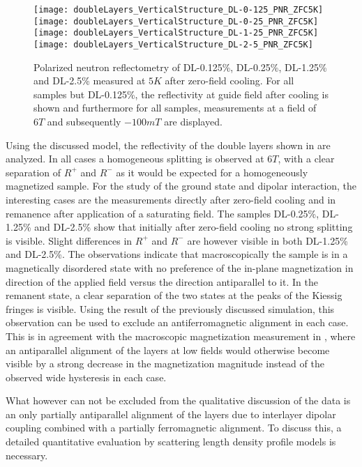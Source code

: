 \documentclass[\main/dresen_thesis.tex]{subfiles}
\begin{document}
  \begin{figure}[tb]
    \centering
    \texttt{[image: doubleLayers\_VerticalStructure\_DL-0-125\_PNR\_ZFC5K]}
    \texttt{[image: doubleLayers\_VerticalStructure\_DL-0-25\_PNR\_ZFC5K]}
    \texttt{[image: doubleLayers\_VerticalStructure\_DL-1-25\_PNR\_ZFC5K]}
    \texttt{[image: doubleLayers\_VerticalStructure\_DL-2-5\_PNR\_ZFC5K]}
    \caption{\label{fig:doubleLayers:pnrData}Polarized neutron reflectometry of DL-0.125\%, DL-0.25\%, DL-1.25\% and DL-2.5\% measured at $5 \unit{K}$ after zero-field cooling. For all samples but DL-0.125\%, the reflectivity at guide field after cooling is shown and furthermore for all samples, measurements at a field of $6 \unit{T}$ and subsequently $-100 \unit{mT}$ are displayed.}
  \end{figure}
  Using the discussed model, the reflectivity of the double layers shown in  are analyzed.
  In all cases a homogeneous splitting is observed at $6 \unit{T}$, with a clear separation of $R^{+}$ and $R^{-}$ as it would be expected for a homogeneously magnetized sample.
  For the study of the ground state and dipolar interaction, the interesting cases are the measurements directly after zero-field cooling and in remanence after application of a saturating field.
  The samples DL-0.25\%, DL-1.25\% and DL-2.5\% show that initially after zero-field cooling no strong splitting is visible.
  Slight differences in $R^{+}$ and $R^{-}$ are however visible in both DL-1.25\% and DL-2.5\%.
  The observations indicate that macroscopically the sample is in a magnetically disordered state with no preference of the in-plane magnetization in direction of the applied field versus the direction antiparallel to it.
  In the remanent state, a clear separation of the two states at the peaks of the Kiessig fringes is visible.
  Using the result of the previously discussed simulation, this observation can be used to exclude an antiferromagnetic alignment in each case.
  This is in agreement with the macroscopic magnetization measurement in , where an antiparallel alignment of the layers at low fields would otherwise become visible by a strong decrease in the magnetization magnitude instead of the observed wide hysteresis in each case.

  What however can not be excluded from the qualitative discussion of the data is an only partially antiparallel alignment of the layers due to interlayer dipolar coupling combined with a partially ferromagnetic alignment.
  To discuss this, a detailed quantitative evaluation by scattering length density profile models is necessary.
\end{document}
